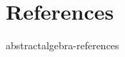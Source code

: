 \documentclass[preview]{standalone}
\begin{document}
\genpage

\nocite{*} %

\section{References}

\begin{snippet}{abstractalgebra-references}
    \printbibliography[heading=none]
\end{snippet}
\end{document}
